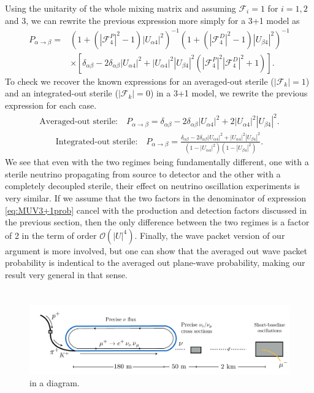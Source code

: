 %
Using the unitarity of the whole mixing matrix and assuming $\mathcal{F}_i = 1$ for $i = 1,2$ and $3$, we can rewrite the previous expression more simply for a 3+1 model as
\begin{align}
P_{\alpha \to \beta} = &\left({1 + (|\mathcal{F}_4^P|^2 - 1) |U_{\alpha 4}|^2 }\right)^{-1} \left({1+(|\mathcal{F}_{4}^D|^2-1)|U_{\beta 4}|^2 }\right)^{-1} \\ \nonumber & \times \left[ \delta_{\alpha \beta} - 2 \delta_{\alpha \beta} |U_{\alpha 4}|^2  + |U_{\alpha 4}|^2 |U_{\beta 4}|^2 \left(|\mathcal{F}_4^P|^2 |\mathcal{F}_4^D|^2 +1 \right) \right].
\end{align}
To check we recover the known expressions for an averaged-out sterile ($|\mathcal{F}_k| = 1$) and an integrated-out sterile ($|\mathcal{F}_k| = 0$) in a 3+1 model, we rewrite the previous expression for each case.
%
\begin{align}
\text{Averaged-out sterile:} \quad P_{\alpha \to \beta} = \delta_{\alpha \beta} - 2 \delta_{\alpha \beta} |U_{\alpha 4}|^2  + 2|U_{\alpha 4}|^2 |U_{\beta 4}|^2.
\end{align}
%
\begin{align}
\text{Integrated-out sterile:} \quad P_{\alpha \to \beta} = \frac{\delta_{\alpha \beta} - 2 \delta_{\alpha \beta} |U_{\alpha 4}|^2  + |U_{\alpha 4}|^2 |U_{\beta 4}|^2}{\left({1 - |U_{\alpha 4}|^2 }\right) \left({1-|U_{\beta 4}|^2 }\right)}. \label{eq:MUV3+1prob}
\end{align}
%
We see that even with the two regimes being fundamentally different, one with a sterile neutrino propagating from source to detector and the other with a completely decoupled sterile, their effect on neutrino oscillation experiments is very similar. If we assume that the two factors in the denominator of expression \ref{eq:MUV3+1prob} cancel with the production and detection factors discussed in the previous section, then the only difference between the two regimes is a factor of 2 in the term of order $\mathcal{O}(|U|^4)$. Finally, the wave packet version of our argument is more involved, but one can show that the averaged out wave packet probability is indentical to the averaged out plane-wave probability, making our result very general in that sense.

%
\section{\nus}
%
\begin{figure}[t]
\centering
\includegraphics[width=\textwidth]{nustorm.pdf}
\caption[The \nus setup in a diagramatic representation.]{\nus in a diagram. \label{fig:nustorm_diagram}}
\end{figure}
%

